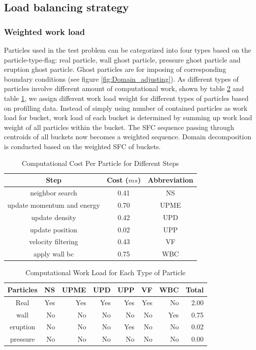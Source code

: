 \documentclass[conference,compsoc]{IEEEtran}
\begin{document}
\subsection{Load balancing strategy}
\subsubsection{Weighted work load}
Particles used in the test problem can be categorized into four types based on the particle-type-flag: real particle, wall ghost particle, pressure ghost particle and eruption ghost particle. Ghost particles are for imposing of corresponding boundary conditions (see figure \ref{fig:Domain_adjusting}). As different types of particles involve different amount of computational work, shown by table \ref{tab:Computational_cost_particles} and table \ref{tab:Computational_cost_steps}, we assign different work load weight for different types of particles based on profilling data. Instead of simply using number of contained particles as work load for bucket, work load of each bucket is determined by summing up work load weight of all particles within the bucket. The SFC sequence passing through centroids of all buckets now becomes a weighted sequence. Domain decomposition  is conducted based on the weighted SFC of buckets.
\begin{table}[t!]
  \renewcommand{\arraystretch}{1.2}
  \centering
  \caption{Computational Cost Per Particle for Different Steps}
  \label{tab:Computational_cost_steps}
  \begin{tabular}{|c|c|c|}
    \hline
    Step & Cost ($ms$) & Abbreviation\\
    \hline
    neighbor search & 0.41 & NS\\
    \hline
    update momentum and energy & 0.70 & UPME\\
    \hline
    update density & 0.42 & UPD\\
    \hline
    update position & 0.02 & UPP\\
    \hline
    velocity filtering& 0.43 & VF\\
    \hline
    apply wall bc & 0.75 & WBC\\
    \hline
  \end{tabular}
\end{table}
\begin{table}[t!]
  \renewcommand{\arraystretch}{1.2}
  \centering
  \caption{Computational Work Load for Each Type of Particle}
  \label{tab:Computational_cost_particles}
  \begin{tabular}{|c|r|r|r|r|r|r|r|}
    \hline
    Particles & NS & UPME & UPD & UPP &VF &WBC &Total\\
    \hline
    Real & Yes & Yes & Yes & Yes & Yes & No & 2.00\\
    \hline
    wall & No & No & No & No & No & Yes &0.75\\
    \hline
    eruption & No & No & No & Yes & No & No & 0.02\\
    \hline
    pressure & No & No & No & No & No & No & 0.00\\
    \hline
  \end{tabular}
\end{table}
\end{document}
